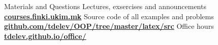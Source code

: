 \begin{frame}{Materials and Questions}{}
    Lectures, exsercises and announcements\\
    \href{http://courses.finki.ukim.mk/}{\textbf{courses.finki.ukim.mk}}
    \vfill
        Source code of all examples and problems\\
    \href{https://github.com/tdelev/OOP/tree/master/latex/src}{\textbf{github.com/tdelev/OOP/tree/master/latex/src}}
    \vfill
        Office hours\\
    \href{http://tdelev.github.io/office/}{\textbf{tdelev.github.io/office/}}
\end{frame}
